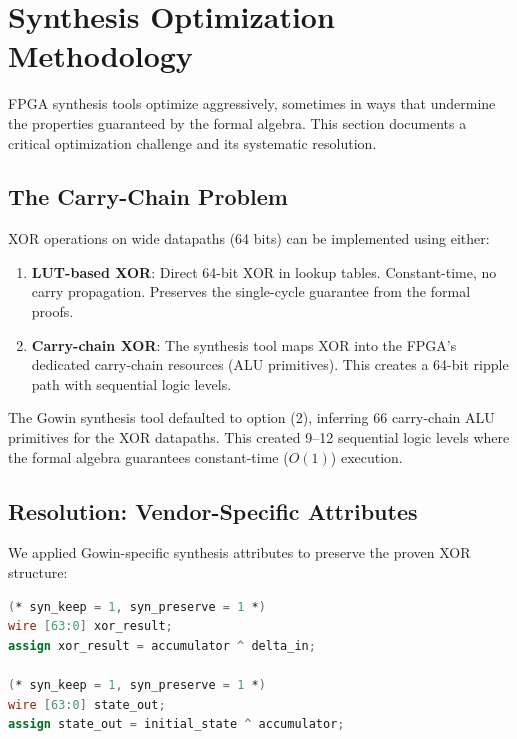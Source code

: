 \documentclass[11pt,letterpaper]{article}
\theoremstyle{plain}
\theoremstyle{definition}
\theoremstyle{remark}
\begin{document}
\section{Synthesis Optimization Methodology}
\label{sec:synthesis}

FPGA synthesis tools optimize aggressively, sometimes in ways that undermine the properties guaranteed by the formal algebra. This section documents a critical optimization challenge and its systematic resolution.

\subsection{The Carry-Chain Problem}

XOR operations on wide datapaths (64 bits) can be implemented using either:
\begin{enumerate}
    \item \textbf{LUT-based XOR}: Direct 64-bit XOR in lookup tables. Constant-time, no carry propagation. Preserves the single-cycle guarantee from the formal proofs.
    \item \textbf{Carry-chain XOR}: The synthesis tool maps XOR into the FPGA's dedicated carry-chain resources (ALU primitives). This creates a 64-bit ripple path with sequential logic levels.
\end{enumerate}

The Gowin synthesis tool defaulted to option (2), inferring 66 carry-chain ALU primitives for the XOR datapaths. This created 9--12 sequential logic levels where the formal algebra guarantees constant-time ($O(1)$) execution.

\subsection{Resolution: Vendor-Specific Attributes}

We applied Gowin-specific synthesis attributes to preserve the proven XOR structure:

\begin{lstlisting}[language=Verilog, caption={Synthesis attributes preventing carry-chain inference.}, label={lst:synkeep}]
(* syn_keep = 1, syn_preserve = 1 *)
wire [63:0] xor_result;
assign xor_result = accumulator ^ delta_in;

(* syn_keep = 1, syn_preserve = 1 *)
wire [63:0] state_out;
assign state_out = initial_state ^ accumulator;
\end{lstlisting}
\end{document}

